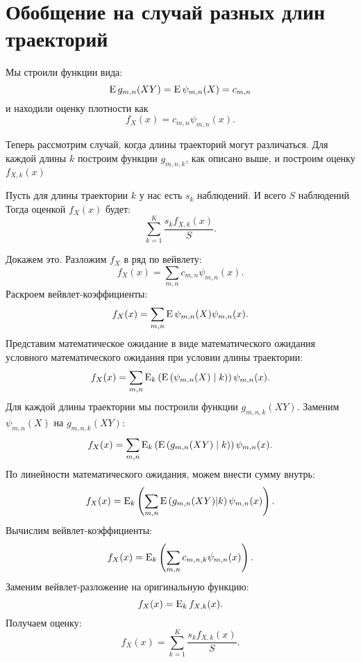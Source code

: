 \documentclass[../paper.tex]{subfiles}
\begin{document}
\section{Обобщение на случай разных длин траекторий}\label{multilength}
Мы строили функции вида:
\[
	\operatorname{E} g_{m,n}(XY) = \operatorname{E} \psi_{m,n}(X) = c_{m,n}
\] и находили оценку плотности как
\[
	f_X(x) = c_{m,n} \psi_{m,n}(x)
.\]

Теперь рассмотрим случай, когда длины траекторий могут различаться.
Для каждой длины $k$ построим функции $g_{m,n,k}$, как описано выше,
и построим оценку $f_{X,k}(x)$

Пусть для длины траектории $k$ у нас есть $s_k$ наблюдений. И всего $S$ наблюдений
Тогда оценкой $f_X(x)$ будет:
\[
	\sum_{k=1}^K \frac{s_k f_{X,k}(x)}{S}
.\]

Докажем это. Разложим $f_X$ в ряд по вейвлету:
\[
	f_X(x) = \sum_{m,n} c_{m,n} \psi_{m,n}(x).
\]
Раскроем вейвлет-коэффициенты:
\[
	f_X(x)
	= \sum_{m,n} \operatorname{E} \psi_{m,n}(X) \psi_{m,n}(x)
.\]
Представим математическое ожидание в виде математического ожидания условного математического ожидания при условии длины траектории:
\[
	f_X(x) 
	= \sum_{m,n} \operatorname{E}_k \left(\operatorname{E} \left(\psi_{m,n}(X) \mid k \right) \right ) \psi_{m,n}(x).
\]
Для каждой длины траектории мы построили функции $g_{m,n,k}(XY)$. Заменим $\psi_{m,n}(X)$ на $g_{m,n,k}(XY)$:
\[
	f_X(x) 
	= \sum_{m,n} \operatorname{E}_k \left(\operatorname{E} \left(g_{m,n}(XY) \mid k \right) \right ) \psi_{m,n}(x).
\]
По линейности математического ожидания, можем внести сумму внутрь:
\[
  f_X(x) = \operatorname{E}_k \left( \sum_{m,n} \operatorname{E} \left(g_{m,n}(XY) | k \right) \psi_{m,n}(x) \right).
\]
Вычислим вейвлет-коэффициенты:
\[
  f_X(x) = \operatorname{E}_k \left(\sum_{m,n} c_{m,n,k} \psi_{m,n}(x) \right).
\]
Заменим вейвлет-разложение на оригинальную функцию:
\[
  f_X(x) = \operatorname{E}_k f_{X,k}(x).
\]
Получаем оценку:
\[
  f_X(x) = \sum_{k=1}^K \frac{s_k f_{X,k}(x)}{S}.
\]
\end{document}
